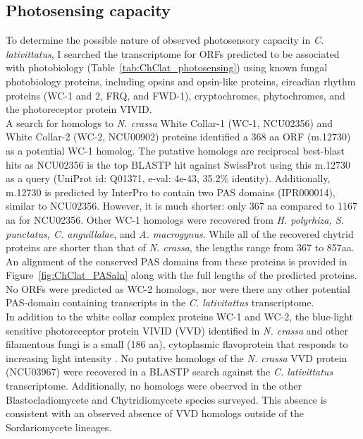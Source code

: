 \subsection*{Photosensing capacity}
To determine the possible nature of observed photosensory capacity in \textit{C. lativittatus}, I searched the transcriptome for ORFs predicted to be associated with photobiology (Table~\ref{tab:ChClat_photosensing}) using known fungal photobiology proteins, including opsins and opsin-like proteins, circadian rhythm proteins (WC-1 and 2, FRQ, and FWD-1), cryptochromes, phytochromes, and the photoreceptor protein VIVID. \\
\indent A search for homologs to \textit{N. crassa} White Collar-1 (WC-1, NCU02356) and White Collar-2 (WC-2, NCU00902) proteins identified a 368 aa ORF (m.12730) as a potential WC-1 homolog. The putative homologs are reciprocal best-blast hits as NCU02356 is the top BLASTP hit against SwissProt using this m.12730 as a query (UniProt id: Q01371, e-val: 4e-43, 35.2\% identity). Additionally, m.12730 is predicted by InterPro to contain two PAS domains (IPR000014), similar to NCU02356. However, it is much shorter: only 367 aa compared to 1167 aa for NCU02356. Other WC-1 homologs were recovered from \textit{H. polyrhiza, S. punctatus, C. anguillalae}, and \textit{A. macrogynus}. While all of the recovered chytrid proteins are shorter than that of \textit{N. crassa}, the lengths range from 367 to 857aa. An alignment of the conserved PAS domains from these proteins is provided in Figure~\ref{fig:ChClat_PASaln} along with the full lengths of the predicted proteins. No ORFs were predicted as WC-2 homologs, nor were there any other potential PAS-domain containing transcripts in the \textit{C. lativitattus} transcriptome. \\
\indent In addition to the white collar complex proteins WC-1 and WC-2, the blue-light sensitive photoreceptor protein VIVID (VVD) identified in \textit{N. crassa} and other filamentous fungi is a small (186 aa), cytoplasmic flavoprotein that responds to increasing light intensity \cite{Schwerdtfeger2003}. No putative homologs of the \textit{N. crassa} VVD protein (NCU03967) were recovered in a BLASTP search against the \textit{C. lativittatus} transcriptome. Additionally, no homologs were observed in the other Blastocladiomycete and Chytridiomycete species surveyed. This absence is consistent with an observed absence of VVD homologs outside of the Sordariomycete lineages.\\
